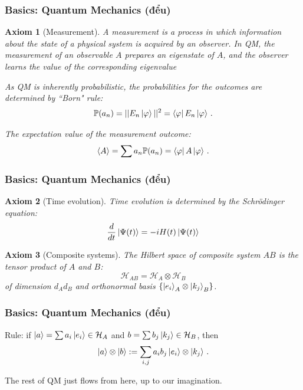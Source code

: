 \documentclass[12pt, aspectratio=169]{beamer}
\newtheorem{axiom}{Axiom}
\begin{document}
\begin{frame}
\frametitle{Basics: Quantum Mechanics (đểu)}
\begin{axiom}[Measurement]
    A measurement is a process in which information about the state of a physical system
    is acquired by an observer. 
    In QM, the measurement of an observable $A$ prepares an eigenstate of $A$, 
    and the observer learns the value of the corresponding eigenvalue 

    As QM is inherently probabilistic, the probabilities for the outcomes are determined by ``Born" rule:
    \begin{equation*}
        \mathbb{P}(a_n) = || E_n \ket{\varphi} ||^2 = \bra{\varphi} E_n \ket{\varphi} \,. 
    \end{equation*}

    The expectation value of the measurement outcome:
    \pause
    \begin{equation*}
        \langle A \rangle = \sum a_n \mathbb{P}(a_n) = \bra{\varphi} A \ket{\varphi} \,.
    \end{equation*}
\end{axiom}
    
\end{frame}


\begin{frame}
\frametitle{Basics: Quantum Mechanics (đểu)}
\begin{axiom}[Time evolution]
    Time evolution is determined by the Schr\"odinger equation:
    \begin{equation*}
    \frac{d}{dt} \ket{\Psi(t)} = -i H(t)\ket{\Psi(t)}
    \end{equation*}
\end{axiom}

\begin{axiom}[Composite systems]
    The Hilbert space of composite system $AB$ is the tensor product of $A$ and $B$:
    \begin{equation*}
        \mathcal{H}_{AB} = \mathcal{H}_A \otimes \mathcal{H}_B
    \end{equation*}
    of dimension $d_A d_B$ and orthonormal basis $\{ \ket{e_i}_A \otimes \ket{k_j}_B \}$.
\end{axiom}

\end{frame}


\begin{frame}
\frametitle{Basics: Quantum Mechanics (đểu)}
Rule: if $\ket{a} = \sum a_i \ket{e_i} \in \mathcal{H}_A$ and 
$b = \sum b_j \ket{k_j} \in \mathcal{H}_B$, then
\begin{equation*}
    \ket{a} \otimes \ket{b} := \sum_{i,j} a_ib_j \ket{e_i}\otimes \ket{k_j} \,.
\end{equation*}
\pause

The rest of QM just flows from here, up to our imagination.
\end{frame}
\end{document}
